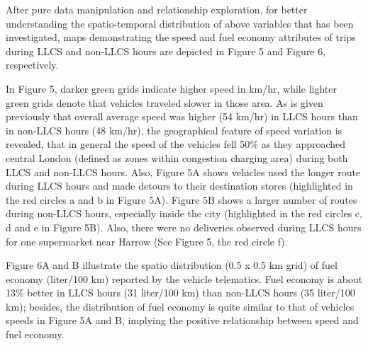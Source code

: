 \documentclass[preprint,12pt,3p]{elsarticle}
\begin{document}
After pure data manipulation and relationship exploration, for better understanding the spatio-temporal distribution of above variables that has been investigated, maps demonstrating the speed and fuel economy attributes of trips during LLCS and non-LLCS hours are depicted in Figure 5 and Figure 6, respectively.

In Figure 5, darker green grids indicate higher speed in km/hr, while lighter green grids denote that vehicles traveled slower in those area. As is given previously that overall average speed was higher (54 km/hr) in LLCS hours than in non-LLCS hours (48 km/hr), the geographical feature of speed variation is revealed, that in general the speed of the vehicles fell 50$\%$ as they approached central London (defined as zones within congestion charging area) during both LLCS and non-LLCS hours. Also, Figure 5A shows vehicles used the longer route during LLCS hours and made detours to their destination stores (highlighted in the red circles a and b in Figure 5A). Figure 5B shows a larger number of routes during non-LLCS hours, especially inside the city (highlighted in the red circles c, d and e in Figure 5B). Also, there were no deliveries observed during LLCS hours for one supermarket near Harrow (See Figure 5, the red circle f). 

Figure 6A and B illustrate the spatio distribution (0.5 x 0.5 km grid) of fuel economy (liter/100 km) reported by the vehicle telematics. Fuel economy is about 13$\%$ better in LLCS hours (31 liter/100 km) than non-LLCS hours (35 liter/100 km); besides, the distribution of fuel economy is quite similar to that of vehicles speeds in Figure 5A and B, implying the positive relationship between speed and fuel economy.
\end{document}
